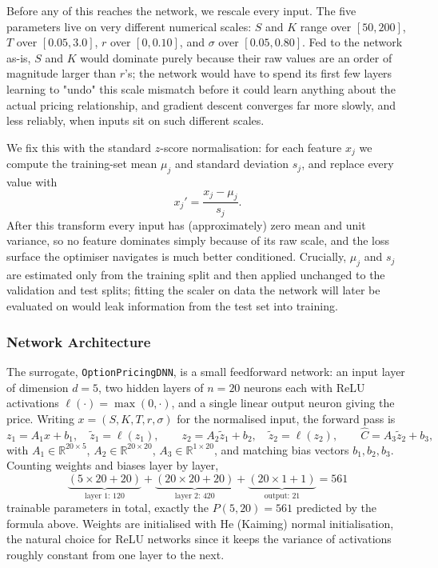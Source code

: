 \documentclass[a4paper,11pt, titlepage]{article}
\theoremstyle{definition}
\theoremstyle{plain}
\theoremstyle{remark}
\begin{document}
Before any of this reaches the network, we rescale every input. The five parameters live on very different numerical scales: $S$ and $K$ range over $[50, 200]$, $T$ over $[0.05, 3.0]$, $r$ over $[0, 0.10]$, and $\sigma$ over $[0.05, 0.80]$. Fed to the network as-is, $S$ and $K$ would dominate purely because their raw values are an order of magnitude larger than $r$'s; the network would have to spend its first few layers learning to "undo" this scale mismatch before it could learn anything about the actual pricing relationship, and gradient descent converges far more slowly, and less reliably, when inputs sit on such different scales.

We fix this with the standard $z$-score normalisation: for each feature $x_j$ we compute the training-set mean $\mu_j$ and standard deviation $s_j$, and replace every value with
\[
x_j' = \frac{x_j - \mu_j}{s_j} .
\]
After this transform every input has (approximately) zero mean and unit variance, so no feature dominates simply because of its raw scale, and the loss surface the optimiser navigates is much better conditioned. Crucially, $\mu_j$ and $s_j$ are estimated only from the training split and then applied unchanged to the validation and test splits; fitting the scaler on data the network will later be evaluated on would leak information from the test set into training.

\subsubsection{Network Architecture}

The surrogate, \texttt{OptionPricingDNN}, is a small feedforward network: an input layer of dimension $d = 5$, two hidden layers of $n = 20$ neurons each with ReLU activations $\ell(\cdot) = \max(0, \cdot)$, and a single linear output neuron giving the price. Writing $x = (S, K, T, r, \sigma)$ for the normalised input, the forward pass is
\[
z_1 = A_1 x + b_1, \quad \tilde z_1 = \ell(z_1), \qquad
z_2 = A_2 \tilde z_1 + b_2, \quad \tilde z_2 = \ell(z_2), \qquad
\hat C = A_3 \tilde z_2 + b_3,
\]
with $A_1 \in \mathbb{R}^{20 \times 5}$, $A_2 \in \mathbb{R}^{20 \times 20}$, $A_3 \in \mathbb{R}^{1 \times 20}$, and matching bias vectors $b_1, b_2, b_3$. Counting weights and biases layer by layer,
\[
\underbrace{(5 \times 20 + 20)}_{\text{layer 1: } 120} + \underbrace{(20 \times 20 + 20)}_{\text{layer 2: } 420} + \underbrace{(20 \times 1 + 1)}_{\text{output: } 21} = 561
\]
trainable parameters in total, exactly the $P(5, 20) = 561$ predicted by the formula above. Weights are initialised with He (Kaiming) normal initialisation, the natural choice for ReLU networks since it keeps the variance of activations roughly constant from one layer to the next.
\end{document}
